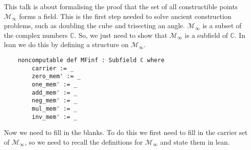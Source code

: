 This talk is about formalising the proof that the set of all constructible points $\mathcal{M}_{\infty}$ forms a field. 
This is the first step needed to solve ancient construction problems, such as doubling the cube and trisecting an angle. 
$\mathcal{M}_{\infty}$ is a subset of the complex numbers $\mathbb{C}$. So, we just need to show that $\mathcal{M}_{\infty}$ is a subfield of $\mathbb{C}$. 
In lean we do this by defining a structure on $\mathcal{M}_{\infty}$.

\begin{lstlisting}
    noncomputable def MFinf : Subfield ℂ where
        carrier := _
        zero_mem' := _
        one_mem' := _
        add_mem' := _
        neg_mem' := _
        mul_mem' := _
        inv_mem' := _
\end{lstlisting}

Now we need to fill in the blanks. To do this we first need to fill in the carrier set of $\mathcal{M}_{\infty}$, 
so we need to recall the definitions for $\mathcal{M}_{\infty}$ and state them in lean.
